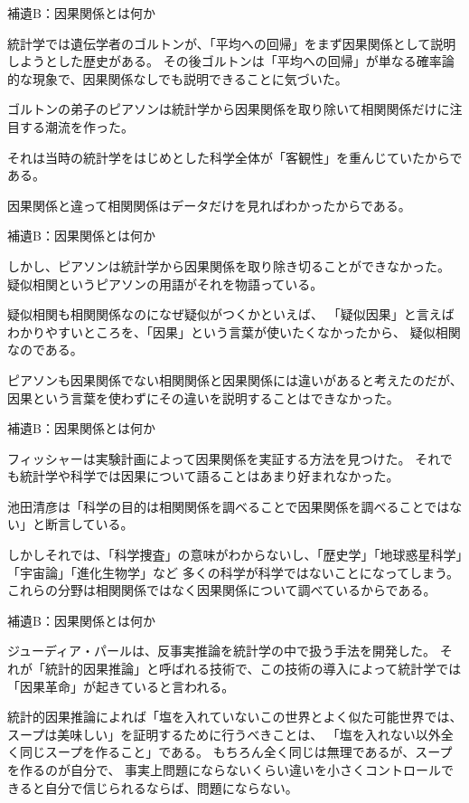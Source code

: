 \documentclass[12pt, unicode]{beamer}
\begin{document}
\begin{frame}{補遺B：因果関係とは何か}

統計学では遺伝学者のゴルトンが、「平均への回帰」をまず因果関係として説明しようとした歴史がある。
その後ゴルトンは「平均への回帰」が単なる確率論的な現象で、因果関係なしでも説明できることに気づいた。

ゴルトンの弟子のピアソンは統計学から因果関係を取り除いて相関関係だけに注目する潮流を作った。

それは当時の統計学をはじめとした科学全体が「客観性」を重んじていたからである。

因果関係と違って相関関係はデータだけを見ればわかったからである。

\end{frame}

\begin{frame}{補遺B：因果関係とは何か}

しかし、ピアソンは統計学から因果関係を取り除き切ることができなかった。
疑似相関というピアソンの用語がそれを物語っている。

疑似相関も相関関係なのになぜ疑似がつくかといえば、
「疑似因果」と言えばわかりやすいところを、「因果」という言葉が使いたくなかったから、
疑似相関なのである。

ピアソンも因果関係でない相関関係と因果関係には違いがあると考えたのだが、
因果という言葉を使わずにその違いを説明することはできなかった。

\end{frame}

\begin{frame}{補遺B：因果関係とは何か}

フィッシャーは実験計画によって因果関係を実証する方法を見つけた。
それでも統計学や科学では因果について語ることはあまり好まれなかった。

池田清彦は「科学の目的は相関関係を調べることで因果関係を調べることではない」と断言している。

しかしそれでは、「科学捜査」の意味がわからないし、「歴史学」「地球惑星科学」「宇宙論」「進化生物学」など
多くの科学が科学ではないことになってしまう。
これらの分野は相関関係ではなく因果関係について調べているからである。

\end{frame}

\begin{frame}{補遺B：因果関係とは何か}

ジューディア・パールは、反事実推論を統計学の中で扱う手法を開発した。
それが「統計的因果推論」と呼ばれる技術で、この技術の導入によって統計学では「因果革命」が起きていると言われる。

統計的因果推論によれば「塩を入れていないこの世界とよく似た可能世界では、スープは美味しい」を証明するために行うべきことは、
「塩を入れない以外全く同じスープを作ること」である。
もちろん全く同じは無理であるが、スープを作るのが自分で、
事実上問題にならないくらい違いを小さくコントロールできると自分で信じられるならば、問題にならない。

\end{frame}
\end{document}
